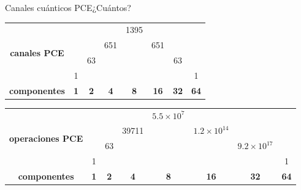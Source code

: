 \documentclass[xcolor=dvipsnames,presentation]{beamer}%
\begin{document}
\begin{frame}{Canales cuánticos PCE}{¿Cuántos?}
\begin{table}[]
\begin{table}[]
\footnotesize
\begin{tabular}{cccccccc}
\multirow{4}{*}{\textbf{canales PCE}} &            &            &            & 1395       &             &             &             \\
                                                      &            &            & 651        &            & 651         &             &             \\
                                                      &            & 63         &            &            &             & 63          &             \\
                                                      & 1          &            &            &            &             &             & 1           \\
\textbf{componentes}                                  & \textbf{1} & \textbf{2} & \textbf{4} & \textbf{8} & \textbf{16} & \textbf{32} & \textbf{64}
\end{tabular}
\end{table}
\end{table} \pause

\begin{table}[]
\footnotesize
\begin{tabular}{cccccccc}
\multirow{4}{*}{\textbf{operaciones PCE}} &            &            &            & $5.5\times 10^7$ &                     &                         &             \\
                                          &            &            & 39711      &             & $1.2\times 10^{14}$ &                         &             \\
                                          &            & 63         &            &             &                     & $9.2\times 10^{17}$ &             \\
                                          & 1          &            &            &             &                     &                         & 1           \\
\textbf{componentes}                      & \textbf{1} & \textbf{2} & \textbf{4} & \textbf{8}  & \textbf{16}         & \textbf{32}             & \textbf{64}
\end{tabular}
\end{table}

\end{frame}
\end{document}

